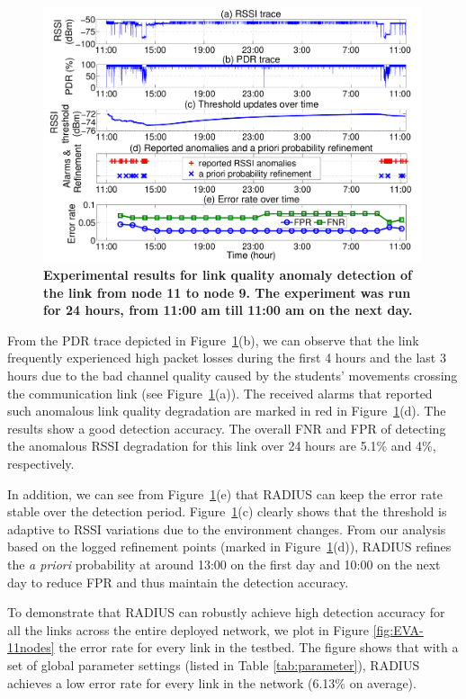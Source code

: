 \begin{figure}[t]
	\centering
	\includegraphics[width=1.0\linewidth, height = 7.5cm]{8-Testbed-1node-24hours}
	\vspace{-0.7cm}
	\caption{\textbf{Experimental results for link quality anomaly detection of the link from node 11 to node 9. The  experiment was run for 24 hours, from 11:00 am till 11:00 am on the next day.}}
	\label{fig:EVA-1node}
	\vspace{-0.2cm}
\end{figure}


From the PDR trace depicted in Figure~\ref{fig:EVA-1node}(b), we can observe that the link frequently experienced high packet losses during the first 4 hours and the last 3 hours due to the bad channel quality caused by the students' movements crossing the communication link (see Figure~\ref{fig:EVA-1node}(a)). The received alarms that reported such anomalous link quality degradation are marked in red in Figure~\ref{fig:EVA-1node}(d). The results show a good detection accuracy. The overall FNR and FPR of detecting the anomalous RSSI degradation for this link over 24 hours are 5.1\% and 4\%, respectively. 

In addition, we can see from Figure~\ref{fig:EVA-1node}(e) that RADIUS can keep the error rate stable over the detection period. Figure~\ref{fig:EVA-1node}(c) clearly shows that the threshold is adaptive to RSSI variations due to the environment changes. From our analysis based on the logged refinement points (marked in Figure~\ref{fig:EVA-1node}(d)), RADIUS refines the \textit{a priori} probability at around 13:00 on the first day and 10:00 on the next day to reduce FPR and thus maintain the detection accuracy. 

To demonstrate that RADIUS can robustly achieve high detection accuracy for all the links across the entire deployed network, we plot in Figure \ref{fig:EVA-11nodes} the error rate for every link in the testbed. The figure shows that with a set of global parameter settings (listed in Table \ref{tab:parameter}), RADIUS achieves a low error rate for every link in the network (6.13\% on average). %



